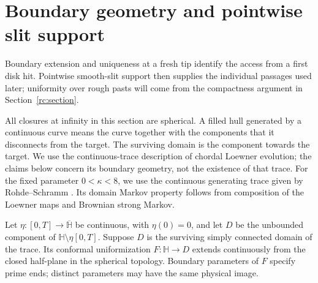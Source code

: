 \section{Boundary geometry and pointwise slit support}
\label{geom:section}

Boundary extension and uniqueness at a fresh tip identify the access
from a first disk hit. Pointwise smooth-slit support then supplies the
individual passages used later; uniformity over rough pasts will come
from the compactness argument in Section~\ref{rc:section}.

All closures at infinity in this section are spherical.  A filled hull
generated by a continuous curve means the curve together with the components
that it disconnects from the target.  The surviving domain is the component
towards the target.  We use the continuous-trace description of chordal
Loewner evolution; the claims below concern its boundary geometry, not the
existence of that trace. For the fixed parameter $0<\kappa<8$, we use
the continuous generating trace given by Rohde--Schramm
\cite[Theorem~5.1]{rohdeschramm2005}. Its domain Markov property follows
from composition of the Loewner maps and Brownian strong Markov.


\begin{lemma}
\label{geom:extension}
Let $\eta:[0,T]\to\overline{\mathbb H}$ be continuous, with $\eta(0)=0$,
and let $D$ be the unbounded component of
$\mathbb H\setminus\eta[0,T]$.  Suppose $D$ is the surviving simply
connected domain of the trace.  Its conformal uniformization
$F:\mathbb H\to D$ extends continuously from the closed half-plane in
the spherical topology.  Boundary parameters of $F$ specify prime ends;
distinct parameters may have the same physical image.
\end{lemma}

